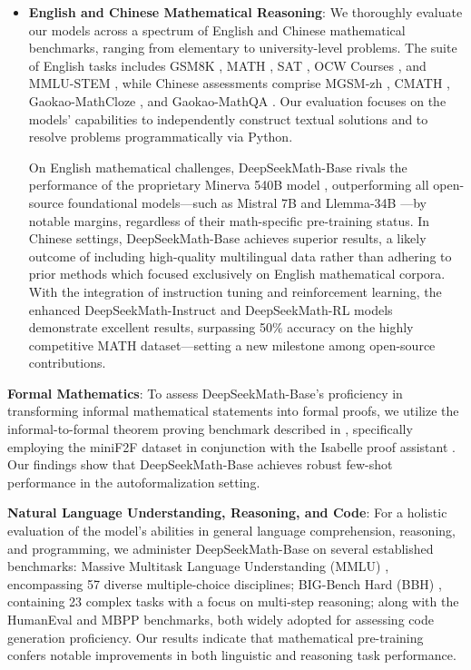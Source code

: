 \begin{itemize}[topsep=0pt]
    \item \textbf{English and Chinese Mathematical Reasoning}: We thoroughly evaluate our models across a spectrum of English and Chinese mathematical benchmarks, ranging from elementary to university-level problems. The suite of English tasks includes GSM8K \citep{gsm8k}, MATH \citep{MATH}, SAT \citep{llemma}, OCW Courses \citep{minerva}, and MMLU-STEM \citep{mmlu}, while Chinese assessments comprise MGSM-zh \citep{mgsm}, CMATH \citep{wei2023cmath}, Gaokao-MathCloze \citep{agieval}, and Gaokao-MathQA \citep{agieval}. Our evaluation focuses on the models’ capabilities to independently construct textual solutions and to resolve problems programmatically via Python.

    On English mathematical challenges, DeepSeekMath-Base rivals the performance of the proprietary Minerva 540B model \citep{minerva}, outperforming all open-source foundational models—such as Mistral 7B \citep{mistral} and Llemma-34B \citep{llemma}—by notable margins, regardless of their math-specific pre-training status. In Chinese settings, DeepSeekMath-Base achieves superior results, a likely outcome of including high-quality multilingual data rather than adhering to prior methods \citep{minerva,llemma} which focused exclusively on English mathematical corpora. With the integration of instruction tuning and reinforcement learning, the enhanced DeepSeekMath-Instruct and DeepSeekMath-RL models demonstrate excellent results, surpassing 50\% accuracy on the highly competitive MATH dataset—setting a new milestone among open-source contributions.
\end{itemize}

\item \textbf{Formal Mathematics}: To assess DeepSeekMath-Base’s proficiency in transforming informal mathematical statements into formal proofs, we utilize the informal-to-formal theorem proving benchmark described in \citep{dsp_proof}, specifically employing the miniF2F dataset \citep{minif2f} in conjunction with the Isabelle proof assistant \citep{isabelle}. Our findings show that DeepSeekMath-Base achieves robust few-shot performance in the autoformalization setting.

\item \textbf{Natural Language Understanding, Reasoning, and Code}: For a holistic evaluation of the model’s abilities in general language comprehension, reasoning, and programming, we administer DeepSeekMath-Base on several established benchmarks: Massive Multitask Language Understanding (MMLU) \citep{mmlu}, encompassing 57 diverse multiple-choice disciplines; BIG-Bench Hard (BBH) \citep{bbh}, containing 23 complex tasks with a focus on multi-step reasoning; along with the HumanEval \citep{codex} and MBPP \citep{mbpp} benchmarks, both widely adopted for assessing code generation proficiency. Our results indicate that mathematical pre-training confers notable improvements in both linguistic and reasoning task performance.

